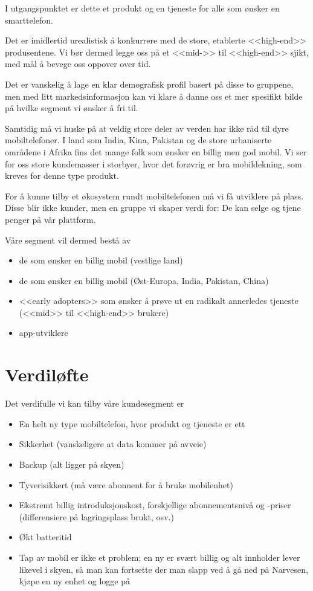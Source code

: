 I utgangspunktet er dette et produkt og en tjeneste for alle som ønsker en
smarttelefon.

Det er imidlertid urealistisk å konkurrere med de store, etablerte <<high-end>>
produsentene.  Vi bør dermed legge oss på et <<mid->> til <<high-end>> sjikt,
med mål å bevege oss oppover over tid.

Det er vanskelig å lage en klar demografisk profil basert på disse to
gruppene, men med litt markedsinformasjon kan vi klare å danne oss et mer
spesifikt bilde på hvilke segment vi ønsker å fri til.

Samtidig må vi huske på at veldig store deler av verden har ikke råd til dyre
mobiltelefoner. I land som India, Kina, Pakistan og de store urbaniserte
områdene i Afrika fins det mange folk som ønsker en billig men god mobil. Vi
ser for oss store kundemasser i storbyer, hvor det forøvrig er bra
mobildekning, som kreves for denne type produkt.

For å kunne tilby et økosystem rundt mobiltelefonen må vi få utviklere på
plass. Disse blir ikke kunder, men en gruppe vi skaper verdi for: De kan selge
og tjene penger på vår plattform.

Våre segment vil dermed bestå av

\begin{itemize}
  \item de som ønsker en billig mobil (vestlige land)
  \item de som ønsker en billig mobil (Øst-Europa, India, Pakistan, China)
  \item <<early adopters>> som ønsker å prøve ut en radikalt annerledes
    tjeneste (<<mid>> til <<high-end>> brukere)
  \item app-utviklere
\end{itemize}

\section{Verdiløfte}

Det verdifulle vi kan tilby våre kundesegment er

\begin{itemize}
  \item En helt ny type mobiltelefon, hvor produkt og tjeneste er ett
  \item Sikkerhet (vanskeligere at data kommer på avveie)
  \item Backup (alt ligger på skyen)
  \item Tyverisikkert (må være abonnent for å bruke mobilenhet)
  \item Ekstremt billig introduksjonskost, forskjellige abonnementsnivå og
    -priser (differensiere på lagringsplass brukt, osv.)
  \item Økt batteritid
  \item Tap av mobil er ikke et problem; en ny er svært billig og alt innholder
    lever likevel i skyen, så man kan fortsette der man slapp ved å gå ned på
    Narvesen, kjøpe en ny enhet og logge på
\end{itemize}

